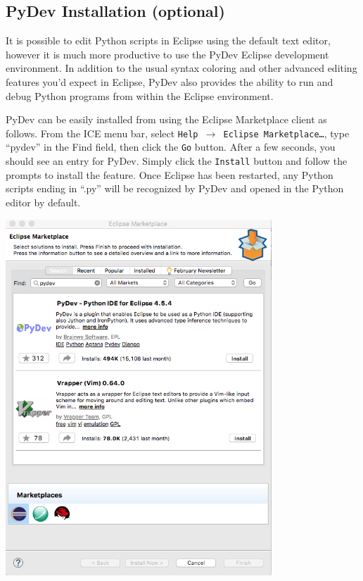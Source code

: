 \subsection{PyDev Installation (optional)} 

It is possible to edit Python scripts in Eclipse using the default text editor,
however it is much more productive to use the PyDev Eclipse development
environment. In addition to the usual syntax coloring and other advanced editing
features you'd expect in Eclipse, PyDev also provides the ability to run and
debug Python programs from within the Eclipse environment.

PyDev can be easily installed from using the Eclipse Marketplace client as
follows. From the ICE menu bar, select \texttt{Help $\rightarrow$ Eclipse
Marketplace\ldots}, type ``pydev'' in the Find field, then click the \texttt{Go}
button.
After a few seconds, you should see an entry for PyDev. Simply click the
\texttt{Install} button and follow the prompts to install the feature. Once
Eclipse has been restarted, any Python scripts ending in ``.py'' will be recognized by
PyDev and opened in the Python editor by default.

\begin{center}
\includegraphics[width=10cm]{images/pydev-marketplace}
\end{center}

